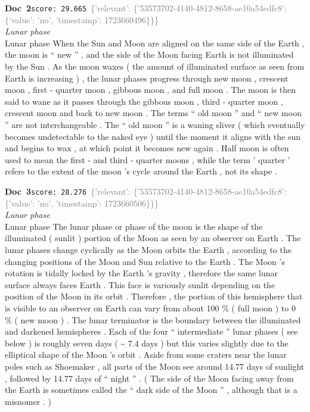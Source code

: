 \documentclass[a4paper,11pt]{article}
\begin{document}
\begin{docenv}
{\footnotesize\textcolor{doccolor}{\textbf{Doc~2}}}\hfill{\tiny\texttt{score:~29.665}}\ {\tiny\textcolor{gray}{\{'relevant': \{'53573702-4140-4812-8658-ae10a54edfc8': \{'value': 'no', 'timestamp': 1723660496\}\}\}}}\\[3pt]
{\small\textit{Lunar phase}}\\[2pt]
\vspace{2pt}
{\footnotesize Lunar phase
When the Sun and Moon are aligned on the same side of the Earth , the moon is `` new '' , and the side of the Moon facing Earth is not illuminated by the Sun . As the moon waxes ( the amount of illuminated surface as seen from Earth is increasing ) , the lunar phases progress through new moon , crescent moon , first - quarter moon , gibbous moon , and full moon . The moon is then said to wane as it passes through the gibbous moon , third - quarter moon , crescent moon and back to new moon . The terms `` old moon '' and `` new moon '' are not interchangeable . The `` old moon '' is a waning sliver ( which eventually becomes undetectable to the naked eye ) until the moment it aligns with the sun and begins to wax , at which point it becomes new again . Half moon is often used to mean the first - and third - quarter moons , while the term ' quarter ' refers to the extent of the moon 's cycle around the Earth , not its shape .}
\end{docenv}
\begin{docenv}
{\footnotesize\textcolor{doccolor}{\textbf{Doc~3}}}\hfill{\tiny\texttt{score:~28.276}}\ {\tiny\textcolor{gray}{\{'relevant': \{'53573702-4140-4812-8658-ae10a54edfc8': \{'value': 'no', 'timestamp': 1723660506\}\}\}}}\\[3pt]
{\small\textit{Lunar phase}}\\[2pt]
\vspace{2pt}
{\footnotesize Lunar phase
The lunar phase or phase of the moon is the shape of the illuminated ( sunlit ) portion of the Moon as seen by an observer on Earth . The lunar phases change cyclically as the Moon orbits the Earth , according to the changing positions of the Moon and Sun relative to the Earth . The Moon 's rotation is tidally locked by the Earth 's gravity , therefore the same lunar surface always faces Earth . This face is variously sunlit depending on the position of the Moon in its orbit . Therefore , the portion of this hemisphere that is visible to an observer on Earth can vary from about 100 \% ( full moon ) to 0 \% ( new moon ) . The lunar terminator is the boundary between the illuminated and darkened hemispheres . Each of the four `` intermediate '' lunar phases ( see below ) is roughly seven days ( \textasciitilde{} 7.4 days ) but this varies slightly due to the elliptical shape of the Moon 's orbit . Aside from some craters near the lunar poles such as Shoemaker , all parts of the Moon see around 14.77 days of sunlight , followed by 14.77 days of `` night '' . ( The side of the Moon facing away from the Earth is sometimes called the `` dark side of the Moon '' , although that is a misnomer . )}
\end{docenv}
\end{document}
